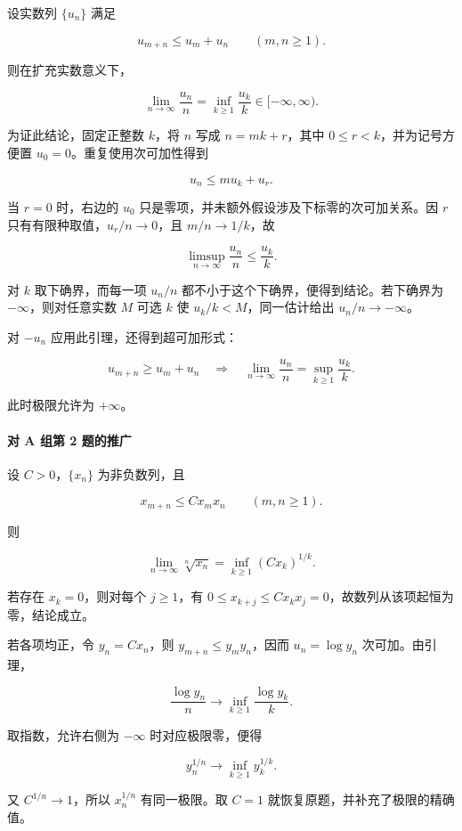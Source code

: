 \documentclass[11pt,a4paper]{article}
\begin{document}
设实数列 \(\{u_n\}\) 满足

\[
u_{m+n}\le u_m+u_n\qquad(m,n\ge1).
\]

则在扩充实数意义下，

\[
\lim_{n\to\infty}\frac{u_n}{n}
=\inf_{k\ge1}\frac{u_k}{k}\in[-\infty,\infty).
\]

为证此结论，固定正整数 \(k\)，将 \(n\) 写成 \(n=mk+r\)，其中
\(0\le r<k\)，并为记号方便置 \(u_0=0\)。重复使用次可加性得到

\[
u_n\le m u_k+u_r.
\]

当 \(r=0\) 时，右边的 \(u_0\)
只是零项，并未额外假设涉及下标零的次可加关系。因 \(r\)
只有有限种取值，\(u_r/n\to0\)，且 \(m/n\to1/k\)，故

\[
\limsup_{n\to\infty}\frac{u_n}{n}\le\frac{u_k}{k}.
\]

对 \(k\) 取下确界，而每一项 \(u_n/n\)
都不小于这个下确界，便得到结论。若下确界为 \(-\infty\)，则对任意实数
\(M\) 可选 \(k\) 使 \(u_k/k<M\)，同一估计给出 \(u_n/n\to-\infty\)。

对 \(-u_n\) 应用此引理，还得到超可加形式：

\[
u_{m+n}\ge u_m+u_n
\quad\Longrightarrow\quad
\lim_{n\to\infty}\frac{u_n}{n}
=\sup_{k\ge1}\frac{u_k}{k}.
\]

此时极限允许为 \(+\infty\)。

\paragraph{对 A 组第 2
题的推广}\label{ux5bf9-a-ux7ec4ux7b2c-2-ux9898ux7684ux63a8ux5e7f}

设 \(C>0\)，\(\{x_n\}\) 为非负数列，且

\[
x_{m+n}\le Cx_mx_n\qquad(m,n\ge1).
\]

则

\[
\boxed{\lim_{n\to\infty}\sqrt[n]{x_n}
=\inf_{k\ge1}(Cx_k)^{1/k}.}
\]

若存在 \(x_k=0\)，则对每个 \(j\ge1\)，有
\(0\le x_{k+j}\le Cx_kx_j=0\)，故数列从该项起恒为零，结论成立。

若各项均正，令 \(y_n=Cx_n\)，则 \(y_{m+n}\le y_my_n\)，因而
\(u_n=\log y_n\) 次可加。由引理，

\[
\frac{\log y_n}{n}\longrightarrow
\inf_{k\ge1}\frac{\log y_k}{k}.
\]

取指数，允许右侧为 \(-\infty\) 时对应极限零，便得

\[
y_n^{1/n}\longrightarrow\inf_{k\ge1}y_k^{1/k}.
\]

又 \(C^{1/n}\to1\)，所以 \(x_n^{1/n}\) 有同一极限。取 \(C=1\)
就恢复原题，并补充了极限的精确值。
\end{document}
